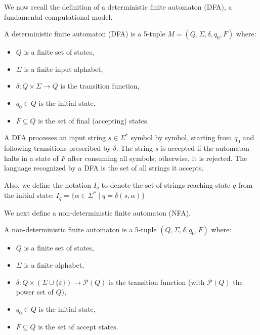 We now recall the definition of a deterministic finite automaton (DFA), a fundamental computational model.
\begin{definition} \label{def:dfa}
    A deterministic finite automaton (DFA) is a 5-tuple $M = (Q, \Sigma, \delta, q_0, F)$ where:
    \begin{itemize}[leftmargin=25pt]
        \item $Q$ is a finite set of states,
        \item $\Sigma$ is a finite input alphabet,
        \item $\delta: Q \times \Sigma \rightarrow Q$ is the transition function,
        \item $q_0 \in Q$ is the initial state,
        \item $F \subseteq Q$ is the set of final (accepting) states.
    \end{itemize}
\end{definition}

A DFA processes an input string $s \in \Sigma^*$ symbol by symbol, starting from $q_0$ and following transitions prescribed by $\delta$. The string $s$ is accepted if the automaton halts in a state of $F$ after consuming all symbols; otherwise, it is rejected. The language recognized by a DFA is the set of all strings it accepts.

Also, we define the notation $I_q$ to denote the set of strings reaching state $q$ from the initial state: $I_q = \{\alpha \in \Sigma^* \mid q = \delta(s, \alpha)\}$

We next define a non-deterministic finite automaton (NFA).
\begin{definition} \label{def:nfa}
    A non-deterministic finite automaton is a 5-tuple $(Q, \Sigma, \delta, q_0, F)$ where:
    \begin{itemize}[leftmargin=25pt]
        \item $Q$ is a finite set of states,
        \item $\Sigma$ is a finite alphabet,
        \item $\delta: Q \times (\Sigma \cup \{\varepsilon\}) \to \mathcal{P}(Q)$ is the transition function (with $\mathcal{P}(Q)$ the power set of $Q$),
        \item $q_0 \in Q$ is the initial state,
        \item $F \subseteq Q$ is the set of accept states.
    \end{itemize}
\end{definition}

